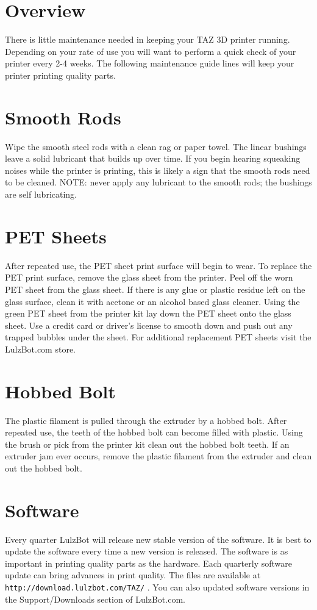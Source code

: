 \section{Overview}
There is little maintenance needed in keeping your TAZ 3D printer running. Depending on your rate of use you will want to perform a quick check of your printer every 2-4 weeks. The following maintenance guide lines will keep your printer printing quality parts.

\section{Smooth Rods}
Wipe the smooth steel rods with a clean rag or paper towel. The linear bushings leave a solid lubricant that builds up over time. If you begin hearing squeaking noises while the printer is printing, this is likely a sign that the smooth rods need to be cleaned. NOTE: never apply any lubricant to the smooth rods; the bushings are self lubricating.

\section{PET Sheets}
After repeated use, the PET sheet print surface will begin to wear. To replace the PET print surface, remove the glass sheet from the printer. Peel off the worn PET sheet from the glass sheet. If there is any glue or plastic residue left on the glass surface, clean it with acetone or an alcohol based glass cleaner. Using the green PET sheet from the printer kit lay down the PET sheet onto the glass sheet. Use a credit card or driver's license to smooth down and push out any trapped bubbles under the sheet. For additional replacement PET sheets visit the LulzBot.com store.

\section{Hobbed Bolt}
The plastic filament is pulled through the extruder by a hobbed bolt. After repeated use, the teeth of the hobbed bolt can become filled with plastic. Using the brush or pick from the printer kit clean out the hobbed bolt teeth. If an extruder jam ever occurs, remove the plastic filament from the extruder and clean out the hobbed bolt.

\section{Software}
Every quarter LulzBot will release new stable version of the software. It is best to update the software every time a new version is released. The software is as important in printing quality parts as the hardware. Each quarterly software update can bring advances in print quality. The files are available at \texttt{http://download.lulzbot.com/TAZ/} . You can also updated software versions in the Support/Downloads section of LulzBot.com.

